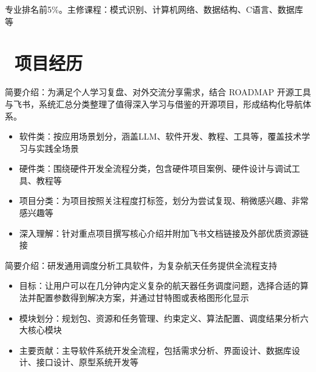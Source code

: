 \documentclass{resume} %
\begin{document}
	专业排名前5\%。主修课程：模式识别、计算机网络、数据结构、C语言、数据库等
	
	\section{\faBriefcase\ 项目经历}
	\large {简要介绍：为满足个人学习复盘、对外交流分享需求，结合 ROADMAP 开源工具与飞书，系统汇总分类整理了值得深入学习与借鉴的开源项目，形成结构化导航体系。}
	\begin{itemize}
		\item 软件类：按应用场景划分，涵盖LLM、软件开发、教程、工具等，覆盖技术学习与实践全场景
		\item 硬件类：围绕硬件开发全流程分类，包含硬件项目案例、硬件设计与调试工具、教程等
		\item 项目分类：为项目按照关注程度打标签，划分为尝试复现、稍微感兴趣、非常感兴趣等
		\item 深入理解：针对重点项目撰写核心介绍并附加飞书文档链接及外部优质资源链接
	\end{itemize}
	
	\large {简要介绍：研发通用调度分析工具软件，为复杂航天任务提供全流程支持}
	\begin{itemize}
		\item 目标：让用户可以在几分钟内定义复杂的航天器任务调度问题，选择合适的算法并配置参数得到解决方案，并通过甘特图或表格图形化显示
		\item 模块划分：规划包、资源和任务管理、约束定义、算法配置、调度结果分析六大核心模块
		\item 主要贡献：主导软件系统开发全流程，包括需求分析、界面设计、数据库设计、接口设计、原型系统开发等
	\end{itemize}
	
\end{document}

